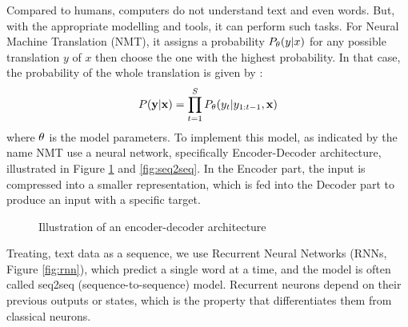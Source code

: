 Compared to humans, computers do not understand text and even words. But, with the appropriate modelling and tools, it can perform such tasks. For Neural Machine Translation (NMT), it assigns a probability  $P_{\mathbf{\theta}}(y|x)$ for any possible translation $y$ of $x$ then choose the one with the highest probability. In that case, the probability of the whole translation is given by :
\begin{equation}
	P(\mathbf{y}|\mathbf{x})=\prod_{t=1}^S P_{\mathbf{\theta}}(y_t|y_{1:t-1}, \mathbf{x})
\end{equation}
where $\mathbf{\theta}$ is the model parameters.
To implement this model, as indicated by the name NMT use a neural network, specifically Encoder-Decoder architecture, illustrated in Figure \ref{fig:enc-dec} and \ref{fig:seq2seq}. In the Encoder part, the input is compressed into a smaller representation, which is fed into the Decoder part to produce an input with a specific target.
\begin{figure}[H]
	\centering
	\caption{Illustration of an encoder-decoder architecture}
	\label{fig:enc-dec}
\end{figure}
Treating, text data as a sequence, we use Recurrent Neural Networks (RNNs, Figure \ref{fig:rnn}), which predict a single word at a time, and the model is often called seq2seq (sequence-to-sequence) model. Recurrent neurons depend on their previous outputs or states, which is the property that differentiates them from classical neurons.
